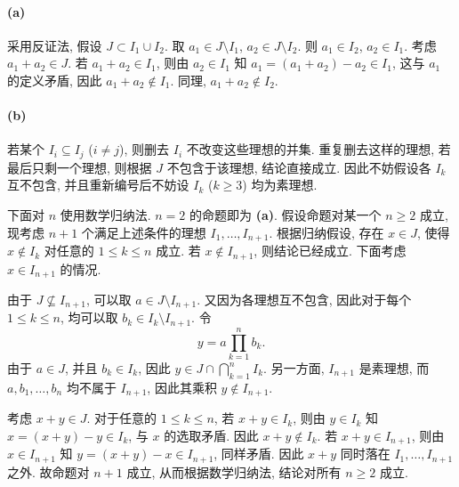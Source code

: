 \documentclass{article}
\begin{document}
\begin{solution}
	\paragraph{(a)} 采用反证法, 假设 $J \subset I_1 \cup I_2$. 取 $a_1 \in J \setminus I_1$, $a_2 \in J \setminus I_2$. 则 $a_1 \in I_2$, $a_2 \in I_1$. 考虑 $a_1 + a_2 \in J$. 若 $a_1 + a_2 \in I_1$, 则由 $a_2 \in I_1$ 知 $a_1 = (a_1 + a_2) - a_2 \in I_1$, 这与 $a_1$ 的定义矛盾, 因此 $a_1 + a_2 \notin I_1$. 同理, $a_1 + a_2 \notin I_2$. 

	\paragraph{(b)} 若某个 $I_i \subseteq I_j$ ($i \neq j$), 则删去 $I_i$ 不改变这些理想的并集. 重复删去这样的理想, 若最后只剩一个理想, 则根据 $J$ 不包含于该理想, 结论直接成立. 因此不妨假设各 $I_k$ 互不包含, 并且重新编号后不妨设 $I_k$ ($k \ge 3$) 均为素理想.

	下面对 $n$ 使用数学归纳法. $n=2$ 的命题即为 \textbf{(a)}. 假设命题对某一个 $n \ge 2$ 成立, 现考虑 $n+1$ 个满足上述条件的理想 $I_1, \dots, I_{n+1}$. 根据归纳假设, 存在 $x \in J$, 使得 $x \notin I_k$ 对任意的 $1 \le k \le n$ 成立. 若 $x \notin I_{n+1}$, 则结论已经成立. 下面考虑 $x \in I_{n+1}$ 的情况.

	由于 $J \nsubseteq I_{n+1}$, 可以取 $a \in J \setminus I_{n+1}$. 又因为各理想互不包含, 因此对于每个 $1 \le k \le n$, 均可以取 $b_k \in I_k \setminus I_{n+1}$. 令
	\[ y = a\prod_{k=1}^{n}b_k. \]
	由于 $a \in J$, 并且 $b_k \in I_k$, 因此 $y \in J \cap \bigcap_{k=1}^{n}I_k$. 另一方面, $I_{n+1}$ 是素理想, 而 $a, b_1, \dots, b_n$ 均不属于 $I_{n+1}$, 因此其乘积 $y \notin I_{n+1}$.

	考虑 $x+y \in J$. 对于任意的 $1 \le k \le n$, 若 $x+y \in I_k$, 则由 $y \in I_k$ 知 $x = (x+y)-y \in I_k$, 与 $x$ 的选取矛盾. 因此 $x+y \notin I_k$. 若 $x+y \in I_{n+1}$, 则由 $x \in I_{n+1}$ 知 $y = (x+y)-x \in I_{n+1}$, 同样矛盾. 因此 $x+y$ 同时落在 $I_1, \dots, I_{n+1}$ 之外. 故命题对 $n+1$ 成立, 从而根据数学归纳法, 结论对所有 $n \ge 2$ 成立.
\end{solution}
\end{document}
